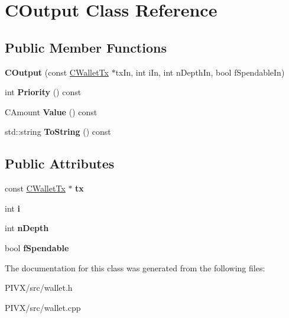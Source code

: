 \hypertarget{class_c_output}{}\section{C\+Output Class Reference}
\label{class_c_output}
\subsection*{Public Member Functions}
\begin{DoxyCompactItemize}
\item 
\mbox{\label{class_c_output_aeabdb54cd3dbac8e985cae6aa976c575}} 
{\bfseries C\+Output} (const \mbox{\hyperlink{class_c_wallet_tx}{C\+Wallet\+Tx}} $\ast$tx\+In, int i\+In, int n\+Depth\+In, bool f\+Spendable\+In)
\item 
\mbox{\label{class_c_output_a1e98c1005aec356c68c4f56ff9a02944}} 
int {\bfseries Priority} () const
\item 
\mbox{\label{class_c_output_ab16e44b7236e505fea97ca1bf8ade631}} 
C\+Amount {\bfseries Value} () const
\item 
std\+::string {\bfseries To\+String} () const
\end{DoxyCompactItemize}
\subsection*{Public Attributes}
\begin{DoxyCompactItemize}
\item 
\mbox{\label{class_c_output_ad5c15e7a2dc48258127b8fd5db421ad5}} 
const \mbox{\hyperlink{class_c_wallet_tx}{C\+Wallet\+Tx}} $\ast$ {\bfseries tx}
\item 
\mbox{\label{class_c_output_ae1b3534a41afb09bb04a499017f2821e}} 
int {\bfseries i}
\item 
\mbox{\label{class_c_output_a2eb24fc73c35fcc551b736d68bd1c64a}} 
int {\bfseries n\+Depth}
\item 
\mbox{\label{class_c_output_ab8fa647313fbc2cda12f8b064031dd11}} 
bool {\bfseries f\+Spendable}
\end{DoxyCompactItemize}


The documentation for this class was generated from the following files\+:\begin{DoxyCompactItemize}
\item 
P\+I\+V\+X/src/wallet.\+h\item 
P\+I\+V\+X/src/wallet.\+cpp\end{DoxyCompactItemize}
